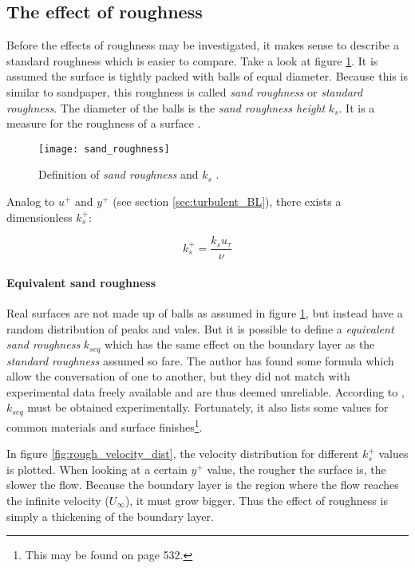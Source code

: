\subsection{The effect of roughness}
Before the effects of roughness may be investigated, it makes sense to describe
a standard roughness which is easier to compare. Take a look at figure
\ref{fig:sand_roughness}. It is assumed the surface is tightly packed with balls
of equal diameter. Because this is similar to sandpaper, this roughness is
called \textit{sand roughness} or \textit{standard roughness}. The diameter of
the balls is the \textit{sand roughness height} $k_{s}$. It is a measure for the
roughness of a surface \cite{Schlichting2018}.

\begin{figure}[H] \centering
\texttt{[image: sand\_roughness]}
    \caption{Definition of \textit{sand roughness} and $k_{s}$ \cite{Schlichting2018}.}
    \label{fig:sand_roughness}
\end{figure}

\noindent Analog to $u^{+}$ and $y^{+}$ (see section \ref{sec:turbulent_BL}),
there exists a dimensionless $k_{s}^{+}$:

\begin{equation}
  k_{s}^{+} = \frac{k_{s}u_{\tau}}{\nu}
\end{equation}

\paragraph{Equivalent sand roughness}
Real surfaces are not made up of balls as assumed in figure
\ref{fig:sand_roughness}, but instead have a random distribution of peaks and
vales. But it is possible to define a \textit{equivalent sand roughness}
$k_{seq}$ which has the same effect on the boundary layer as the
\textit{standard roughness} assumed so fare. The author has found some formula
which allow the conversation of one to another, but they did not match with
experimental data freely available and are thus deemed unreliable. According to
\cite{Schlichting2018}, $k_{seq}$ must be obtained experimentally. Fortunately,
it also lists some values for common materials and surface
finishes\footnote{This may be found on page 532.}.


In figure \ref{fig:rough_velocity_dist}, the velocity distribution for different
$k_{s}^{+}$ values is plotted. When looking at a certain $y^{+}$ value, the
rougher the surface is, the slower the flow. Because the boundary layer is the
region where the flow reaches the infinite velocity ($U_{\infty}$), it must grow
bigger. Thus the effect of roughness is simply a thickening of the boundary
layer.

